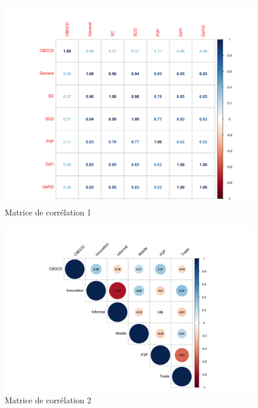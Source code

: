 \documentclass[12pt]{article}
\begin{document}
\clearpage


\begin{figure}
    \centering
    \includegraphics[width=1\linewidth]{Corr CBDC_Crypto.png}
    \caption{Matrice de corrélation 1}
    \label{fig:Correlation 1}
\end{figure}



\begin{figure}
    \hspace{-0.9cm}
    \includegraphics[width=1.2\linewidth]{Corr_Total 2.png}
    \caption{Matrice de corrélation 2}
    \label{fig:Correlaion 2}
\end{figure}

\clearpage
\end{document}
